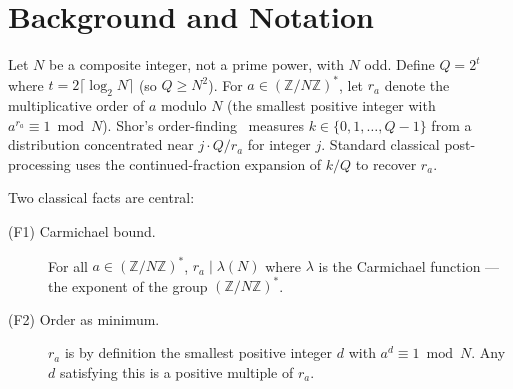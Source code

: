 \documentclass[11pt]{article}
\begin{document}
\begin{abstract}
and conclude that while every individual ingredient is folklore, the \emph{clean statement of the noise-invariance corollary} appears not to be made explicit in surveyed literature. We additionally show that two natural attempts to improve measurement count beyond this scheme --- adaptive base selection and lattice-based joint post-processing --- yield no further reduction, suggesting the theorem captures the essential structure of the problem at this scale. Finally, we document a universal trial-level mechanism observation at $(N, d) = (437, 4)$: across $13$ independent base sets ($200$ trials $\times$ $12$ $\sigma$ values each), phase noise $\sigma \in [0.005, 0.100]$ reliably flips a small number of trials at one of the $K$-bin boundaries (primarily $K{=}1/K{=}2$, occasionally $K{=}2/K{=}3$) of single-run factoring --- but the direction (success $\leftrightarrow$ failure) is base-set-stochastic, and the cross-seed mean SR ($+0.14\%$, $t{=}0.51$, $p{=}0.31$ at $\sigma{=}0.050$) shows no statistically significant net bias. The mechanism is qualitatively a member of the stochastic-resonance family and provides a conceptual bridge to the noise-as-resource literature (ENAQT) but is too small in absolute terms to enable cryptographic advantage.
\end{abstract}

\section{Background and Notation}
\label{sec:background}

Let $N$ be a composite integer, not a prime power, with $N$ odd. Define $Q = 2^t$ where $t = 2\lceil \log_2 N \rceil$ (so $Q \geq N^2$). For $a \in (\mathbb{Z}/N\mathbb{Z})^*$, let $r_a$ denote the multiplicative order of $a$ modulo $N$ (the smallest positive integer with $a^{r_a} \equiv 1 \bmod N$). Shor's order-finding~\cite{shor1994,nielsenchuang2000} measures $k \in \{0, 1, \ldots, Q-1\}$ from a distribution concentrated near $j \cdot Q / r_a$ for integer $j$. Standard classical post-processing uses the continued-fraction expansion of $k/Q$ to recover $r_a$.

Two classical facts are central:

\begin{description}
\item[(F1) Carmichael bound.] For all $a \in (\mathbb{Z}/N\mathbb{Z})^*$, $r_a \mid \lambda(N)$ where $\lambda$ is the Carmichael function --- the exponent of the group $(\mathbb{Z}/N\mathbb{Z})^*$.
\item[(F2) Order as minimum.] $r_a$ is by definition the smallest positive integer $d$ with $a^d \equiv 1 \bmod N$. Any $d$ satisfying this is a positive multiple of $r_a$.
\end{description}
\end{document}
